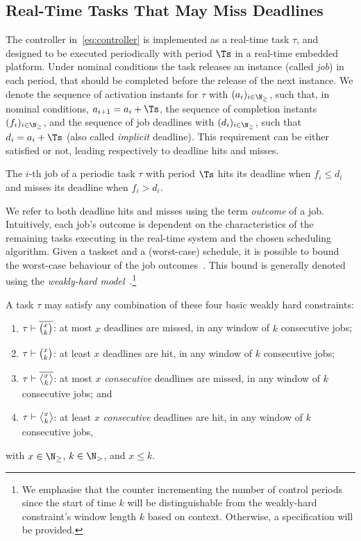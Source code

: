 \subsection{Real-Time Tasks That May Miss Deadlines}
\label{ssec:whalgebra}
%
The controller in~\eqref{eq:controller} is implemented as a real-time task $\tau$, and designed to be executed periodically with period $\Ts$ in a real-time embedded platform.
Under nominal conditions the task releases an instance (called \emph{job}) in each period, that should be completed before the release of the next instance.
We denote the sequence of activation instants for $\tau$ with $(a_i)_{i \in \N_{\geq}}$, such that, in nominal conditions, $a_{i+1} = a_i+\Ts$,  the sequence of completion instants $(f_i)_{i \in \N_{\geq}}$, and the sequence of job deadlines with $(d_i)_{i \in \N_{\geq}}$, such that $d_i = a_i + \Ts$ (also called \emph{implicit} deadline).
This requirement can be either satisfied or not, leading respectively to deadline hits and misses.
%
\begin{definition}%
\label{def:hit}%
    The $i$-th job of a periodic task $\tau$ with period $\Ts$ hits its deadline when $f_i \leq d_i$ and misses its deadline when $f_i > d_i$.
\end{definition}
%
We refer to both deadline hits and misses using the term \emph{outcome} of a job.
Intuitively, each job's outcome is dependent on the characteristics of the remaining tasks executing in the real-time system and the chosen scheduling algorithm.
Given a taskset and a (worst-case) schedule, it is possible to bound the worst-case behaviour of the job outcomes~\cite{Bernat:2001, Ernst:2015}.
This bound is generally denoted using the \emph{weakly-hard model}~\cite{Bernat:2001}.\footnote{We emphasise that the counter incrementing the number of control periods since the start of time $k$ will be distinguishable from the weakly-hard constraint's window length $k$ based on context. Otherwise, a specification will be provided.}
%
\begin{definition}%
\label{def:weakly-hard}%
    A task $\tau$ may satisfy any combination of these four basic weakly
    hard constraints:
    \begin{enumerate}[label=(\roman*)]
        \item \label{item:mk} $\tau \vdash \overline{\binom{x_{}}{k_{}}}$: at most $x$ deadlines are missed, in any window of $k$ consecutive jobs;
        \item \label{item:hk} $\tau \vdash \binom{x_{}}{k_{}}$: at least $x$ deadlines are hit, in any window of $k$ consecutive jobs;
        \item \label{item:cons} $\tau \vdash \rowmiss{}$: at most $x$ \emph{consecutive} deadlines are missed, in any window of $k$ consecutive jobs; and
        \item $\tau \vdash \rowhit{}$: at least $x$ \emph{consecutive} deadlines are hit, in any window of $k$ consecutive jobs,
    \end{enumerate}
    with $x\in \N_{\geq}$, $k \in \N_{>}$, and $x\leq k$.
\end{definition}
